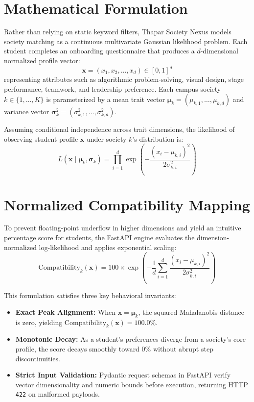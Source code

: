 \documentclass[12pt,a4paper]{report}
\begin{document}
\section{Mathematical Formulation}
Rather than relying on static keyword filters, Thapar Society Nexus models society matching as a continuous multivariate Gaussian likelihood problem. Each student completes an onboarding questionnaire that produces a $d$-dimensional normalized profile vector:
\begin{equation}
    \mathbf{x} = (x_1, x_2, \dots, x_d) \in [0, 1]^d
\end{equation}
representing attributes such as algorithmic problem-solving, visual design, stage performance, teamwork, and leadership preference. Each campus society $k \in \{1, \dots, K\}$ is parameterized by a mean trait vector $\boldsymbol{\mu}_k = (\mu_{k,1}, \dots, \mu_{k,d})$ and variance vector $\boldsymbol{\sigma}_k^2 = (\sigma_{k,1}^2, \dots, \sigma_{k,d}^2)$.

Assuming conditional independence across trait dimensions, the likelihood of observing student profile $\mathbf{x}$ under society $k$'s distribution is:
\begin{equation}
    L(\mathbf{x} \mid \boldsymbol{\mu}_k, \boldsymbol{\sigma}_k) = \prod_{i=1}^{d} \exp\left( -\frac{(x_i - \mu_{k,i})^2}{2\sigma_{k,i}^2} \right)
\end{equation}

\section{Normalized Compatibility Mapping}
To prevent floating-point underflow in higher dimensions and yield an intuitive percentage score for students, the FastAPI engine evaluates the dimension-normalized log-likelihood and applies exponential scaling:
\begin{equation}
    \text{Compatibility}_k(\mathbf{x}) = 100 \times \exp\left( -\frac{1}{d} \sum_{i=1}^{d} \frac{(x_i - \mu_{k,i})^2}{2\sigma_{k,i}^2} \right)
\end{equation}

This formulation satisfies three key behavioral invariants:
\begin{itemize}[noitemsep]
    \item \textbf{Exact Peak Alignment:} When $\mathbf{x} = \boldsymbol{\mu}_k$, the squared Mahalanobis distance is zero, yielding $\text{Compatibility}_k(\mathbf{x}) = 100.0\%$.
    \item \textbf{Monotonic Decay:} As a student's preferences diverge from a society's core profile, the score decays smoothly toward $0\%$ without abrupt step discontinuities.
    \item \textbf{Strict Input Validation:} Pydantic request schemas in FastAPI verify vector dimensionality and numeric bounds before execution, returning HTTP \texttt{422} on malformed payloads.
\end{itemize}
\end{document}
